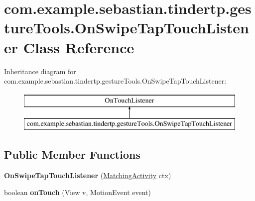 \hypertarget{classcom_1_1example_1_1sebastian_1_1tindertp_1_1gestureTools_1_1OnSwipeTapTouchListener}{}\section{com.\+example.\+sebastian.\+tindertp.\+gesture\+Tools.\+On\+Swipe\+Tap\+Touch\+Listener Class Reference}
\label{classcom_1_1example_1_1sebastian_1_1tindertp_1_1gestureTools_1_1OnSwipeTapTouchListener}
Inheritance diagram for com.\+example.\+sebastian.\+tindertp.\+gesture\+Tools.\+On\+Swipe\+Tap\+Touch\+Listener\+:\begin{figure}[H]
\begin{center}
\leavevmode
\includegraphics[height=2.000000cm]{classcom_1_1example_1_1sebastian_1_1tindertp_1_1gestureTools_1_1OnSwipeTapTouchListener}
\end{center}
\end{figure}
\subsection*{Public Member Functions}
\begin{DoxyCompactItemize}
\item 
{\bfseries On\+Swipe\+Tap\+Touch\+Listener} (\hyperlink{classcom_1_1example_1_1sebastian_1_1tindertp_1_1MatchingActivity}{Matching\+Activity} ctx)\hypertarget{classcom_1_1example_1_1sebastian_1_1tindertp_1_1gestureTools_1_1OnSwipeTapTouchListener_a8e4f82f6a981a540082f597e87d577d9}{}\label{classcom_1_1example_1_1sebastian_1_1tindertp_1_1gestureTools_1_1OnSwipeTapTouchListener_a8e4f82f6a981a540082f597e87d577d9}

\item 
boolean {\bfseries on\+Touch} (View v, Motion\+Event event)\hypertarget{classcom_1_1example_1_1sebastian_1_1tindertp_1_1gestureTools_1_1OnSwipeTapTouchListener_ac394faaf38a347b78425d0a879910452}{}\label{classcom_1_1example_1_1sebastian_1_1tindertp_1_1gestureTools_1_1OnSwipeTapTouchListener_ac394faaf38a347b78425d0a879910452}

\end{DoxyCompactItemize}

